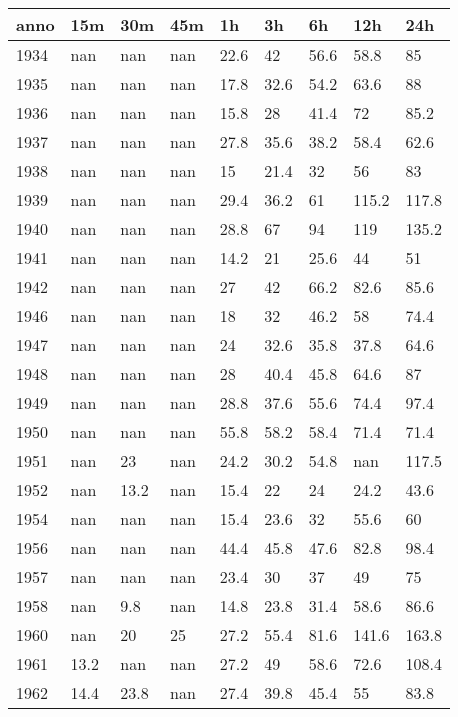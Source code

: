 \documentclass{standalone}
\begin{document}
 
\begin{tabular}{lllllllll}
\toprule
anno & 15m  & 30m  & 45m  & 1h   & 3h   & 6h    & 12h   & 24h   \\
\midrule
1934 & nan  & nan  & nan  & 22.6 & 42   & 56.6  & 58.8  & 85    \\
1935 & nan  & nan  & nan  & 17.8 & 32.6 & 54.2  & 63.6  & 88    \\
1936 & nan  & nan  & nan  & 15.8 & 28   & 41.4  & 72    & 85.2  \\
1937 & nan  & nan  & nan  & 27.8 & 35.6 & 38.2  & 58.4  & 62.6  \\
1938 & nan  & nan  & nan  & 15   & 21.4 & 32    & 56    & 83    \\
1939 & nan  & nan  & nan  & 29.4 & 36.2 & 61    & 115.2 & 117.8 \\
1940 & nan  & nan  & nan  & 28.8 & 67   & 94    & 119   & 135.2 \\
1941 & nan  & nan  & nan  & 14.2 & 21   & 25.6  & 44    & 51    \\
1942 & nan  & nan  & nan  & 27   & 42   & 66.2  & 82.6  & 85.6  \\
1946 & nan  & nan  & nan  & 18   & 32   & 46.2  & 58    & 74.4  \\
1947 & nan  & nan  & nan  & 24   & 32.6 & 35.8  & 37.8  & 64.6  \\
1948 & nan  & nan  & nan  & 28   & 40.4 & 45.8  & 64.6  & 87    \\
1949 & nan  & nan  & nan  & 28.8 & 37.6 & 55.6  & 74.4  & 97.4  \\
1950 & nan  & nan  & nan  & 55.8 & 58.2 & 58.4  & 71.4  & 71.4  \\
1951 & nan  & 23   & nan  & 24.2 & 30.2 & 54.8  & nan   & 117.5 \\
1952 & nan  & 13.2 & nan  & 15.4 & 22   & 24    & 24.2  & 43.6  \\
1954 & nan  & nan  & nan  & 15.4 & 23.6 & 32    & 55.6  & 60    \\
1956 & nan  & nan  & nan  & 44.4 & 45.8 & 47.6  & 82.8  & 98.4  \\
1957 & nan  & nan  & nan  & 23.4 & 30   & 37    & 49    & 75    \\
1958 & nan  & 9.8  & nan  & 14.8 & 23.8 & 31.4  & 58.6  & 86.6  \\
1960 & nan  & 20   & 25   & 27.2 & 55.4 & 81.6  & 141.6 & 163.8 \\
1961 & 13.2 & nan  & nan  & 27.2 & 49   & 58.6  & 72.6  & 108.4 \\
1962 & 14.4 & 23.8 & nan  & 27.4 & 39.8 & 45.4  & 55    & 83.8  \\

\end{tabular}
\end{document}
